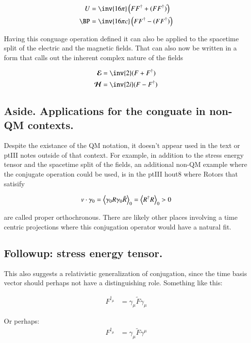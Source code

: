 \documentclass{article}
\newcommand{\EE}[0]{\boldsymbol{\mathcal{E}}}
\newcommand{\HH}[0]{\boldsymbol{\mathcal{H}}}
\begin{document}
\begin{align}
U &= \inv{16 \pi} \left(F F^\dagger + (F F^\dagger)^{\tilde{}} \right) \\
\BP &= \inv{16 \pi c} \left(F F^\dagger - (F F^\dagger)^{\tilde{}} \right)
\end{align}

Having this conguage operation defined it can also be applied to the
spacetime split of the electric and the magnetic fields.  That can also now be written in a form
that calls out the inherent complex nature of the fields

\begin{align}
\EE &= \inv{2}(F + F^\dagger ) \\
\HH &= \inv{2i}(F - F^\dagger )
\end{align}

\subsection{ Aside.  Applications for the conguate in non-QM contexts. }

Despite the existance of the QM notation, it doesn't appear used in the text or ptIII notes outside of that context.
For example,
in addition to the
stress energy tensor and the spacetime split of the fields, an additional non-QM example
where the conjugate operation could be used, is in the ptIII hout8 where Rotors that satisify

\begin{align}
v \cdot \gamma_0 = {\left\langle{{\gamma_0 R \gamma_0 \tilde{R}}}\right\rangle}_{0} = {\left\langle{{R^\dagger R}}\right\rangle}_{0} > 0
\end{align}

are called proper orthochronous.  There are likely other places involving a time centric projections where this
conjugation operator would have a natural fit.

\subsection{ Followup: stress energy tensor. }

This also suggests a relativistic generalization of conjugation, since the time basis vector should perhaps not have
a distinguishing role.  Something like this:

\begin{align*}
F^{\dagger_\mu} &= \gamma_\mu \tilde{F} \gamma_\mu
\end{align*}

Or perhaps:
\begin{align*}
F^{\dagger_\mu} &= \gamma_\mu \tilde{F} \gamma^\mu
\end{align*}
\end{document}

